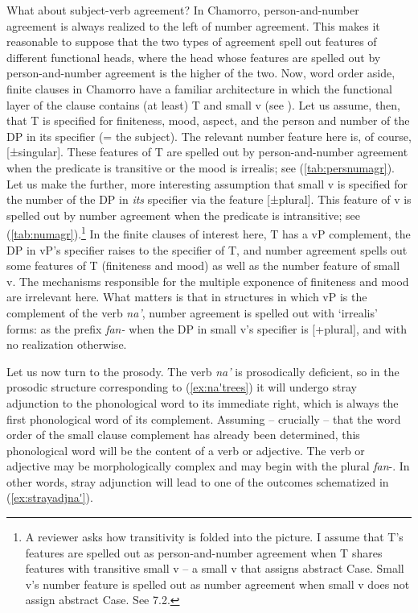 \documentclass[output=paper,
modfonts
]{LSP/langsci}
\begin{document}
\begin{exe}
\begin{xlist}
What about subject-verb agreement? In Chamorro, person-and-number
agreement is always realized to the left of number agreement. This makes
it reasonable to suppose that the two types of agreement spell out
features of different functional heads, where the head whose features
are spelled out by person-and-number agreement is the higher of the two.
Now, word order aside, finite clauses in Chamorro have a familiar
architecture in which the functional layer of the clause contains (at
least) T and small v (see \citealt{chung1998,chung2004}). Let us assume, then,
that T is specified for finiteness, mood, aspect, and the person and
number of the DP in its specifier (= the subject). The relevant number
feature here is, of course, {[}±singular{]}. These features of T are
spelled out by person-and-number agreement when the predicate is
transitive or the mood is irrealis; see (\ref{tab:persnumagr}). Let us make the further,
more interesting assumption that small v is specified for the number of
the DP in \emph{its} specifier via the feature {[}±plural{]}. This
feature of v is spelled out by number agreement when the predicate is
intransitive; see (\ref{tab:numagr}).\footnote{A reviewer asks how transitivity is
  folded into the picture. I assume that T's features are spelled out as
  person-and-number agreement when T shares features with transitive
  small v -- a small v that assigns abstract Case. Small v's number
  feature is spelled out as number agreement when small v does not
  assign abstract Case. See 7.2.} In the finite clauses of interest
here, T has a vP complement, the DP in vP's specifier raises to the
specifier of T, and number agreement spells out some features of T
(finiteness and mood) as well as the number feature of small v. The
mechanisms responsible for the multiple exponence of finiteness and mood
are irrelevant here. What matters is that in structures in which vP is
the complement of the verb \emph{na'}, number agreement is spelled out
with `irrealis' forms: as the prefix \emph{fan-} when the DP in small
v's specifier is {[}+plural{]}, and with no realization otherwise.

Let us now turn to the prosody. The verb \emph{na'} is prosodically
deficient, so in the prosodic structure corresponding to (\ref{ex:na'trees}) it will
undergo stray adjunction to the phonological word to its immediate
right, which is always the first phonological word of its complement.
Assuming -- crucially -- that the word order of the small clause
complement has already been determined, this phonological word will be
the content of a verb or adjective. The verb or adjective may be
morphologically complex and may begin with the plural \emph{fan}-. In
other words, stray adjunction will lead to one of the outcomes
schematized in (\ref{ex:strayadjna'}).


\end{xlist}
\end{exe}
\end{document}
